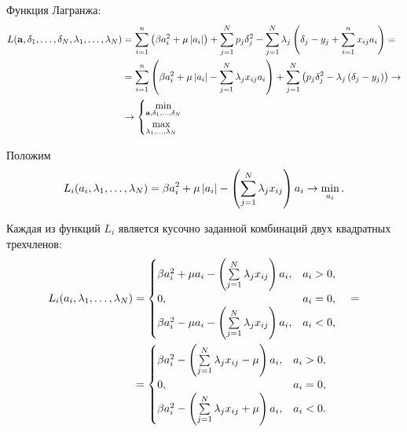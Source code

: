 Функция Лагранжа:
\begin{equation}
	\label{LagrWEN}
	\begin{split}
		L(\boldsymbol{\mathbf{a}},\delta_{1},\ldots,\delta_{N}, \lambda_{1},\ldots,\lambda_{N}) 
	&= \sum\limits_{i=1}^n\left(\beta a_i^2 + \mu \left|a_i\right|\right) + \sum\limits_{j=1}^N p_j\delta_j^2 - \sum_{j=1}^N\lambda_j\left(\delta_j - y_j + \sum\limits_{i=1}^nx_{ij}a_i\right) = \\
	&= \sum\limits_{i=1}^n\left(\beta a_i^2 + \mu \left|a_i\right| - \sum\limits_{j=1}^N\lambda_jx_{ij}a_i\right) + \sum\limits_{j=1}^N \left(p_j\delta_j^2  - \lambda_j\left(\delta_j - y_j\right)\right) \to \\
	&\to 
	\begin{cases}
		\mathop{\mbox{min}}\limits_{\boldsymbol{\mathbf{a}},\delta_{1},\ldots,\delta_{N}}\\
		\mathop{\mbox{max}}\limits_{\lambda_{1},\ldots,\lambda_{N}}\\
	\end{cases}
	\end{split}
\end{equation}



\def\LiPart{L_i(a_i,\idots \lambda1N)}
\def\sumLambdaX{\suml_{j=1}^N\lambda_jx_{ij}}

Положим 
\begin{equation}
	\label{partialLagr}
	\LiPart = \beta a_i^2 + \mu \modul{a_i} - \cbr{\sumLambdaX}a_i \to \min_{a_i}.
\end{equation}

Каждая из функций $L_i$ является кусочно заданной комбинаций двух квадратных трехчленов:
\begin{equation}
	\label{partialLagrParted}
	\begin{split}
		\LiPart 
		&= \begin{cases}
			\beta a_i^2 + \mu a_i - \cbr{\sumLambdaX}a_i, &a_i > 0,\\
			0, &a_i = 0,\\
			\beta a_i^2 - \mu a_i - \cbr{\sumLambdaX}a_i, &a_i < 0,\\
		\end{cases} \quad= \\
		&= \begin{cases}
			\beta a_i^2 - \cbr{\sumLambdaX-\mu}a_i, &a_i > 0,\\
			0, &a_i = 0,\\
			\beta a_i^2 - \cbr{\sumLambdaX+\mu}a_i, &a_i < 0.\\
		\end{cases}	
	\end{split}
\end{equation}

